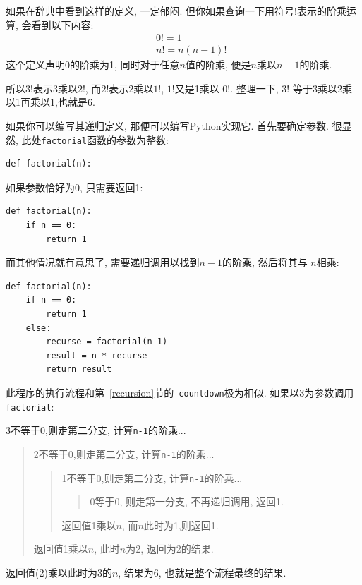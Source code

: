 \documentclass[10pt]{book}
\begin{document}
如果在辞典中看到这样的定义, 一定郁闷. 
但你如果查询一下用符号$!$表示的阶乘运算, 
会看到以下内容:
%
\begin{eqnarray*}
&&  0! = 1 \\
&&  n! = n (n-1)!
\end{eqnarray*}
%
这个定义声明0的阶乘为1, 同时对于任意$n$值的阶乘, 便是$n$乘以$n-1$的阶乘. 

所以$3!$表示3乘以$2!$,  而$2!$表示2乘以$1!$, $1!$又是1乘以
$0!$. 整理一下, $3!$ 等于3乘以2乘以1再乘以1,也就是6.

如果你可以编写其递归定义, 那便可以编写Python实现它. 
首先要确定参数. 很显然, 此处{\tt factorial}函数的参数为整数:

\begin{verbatim}
def factorial(n):
\end{verbatim}
%
如果参数恰好为0, 只需要返回1:

\begin{verbatim}
def factorial(n):
    if n == 0:
        return 1
\end{verbatim}
%
而其他情况就有意思了, 需要递归调用以找到$n-1$的阶乘, 然后将其与
$n$相乘:

\begin{verbatim}
def factorial(n):
    if n == 0:
        return 1
    else:
        recurse = factorial(n-1)
        result = n * recurse
        return result
\end{verbatim}
%
此程序的执行流程和第~\ref{recursion}节的{\tt
countdown}极为相似. 如果以3为参数调用{\tt factorial}:

3不等于0,则走第二分支, 计算{\tt n-1}的阶乘...

\begin{quote}
2不等于0,则走第二分支, 计算{\tt n-1}的阶乘...


  \begin{quote}
 1不等于0,则走第二分支, 计算{\tt n-1}的阶乘...


    \begin{quote}
   0等于0, 则走第一分支, 不再递归调用, 返回1.
    \end{quote}

  返回值1乘以$n$, 而$n$此时为1,则返回1. 
  \end{quote}

返回值1乘以$n$, 此时$n$为2, 返回为2的结果.
\end{quote}

返回值(2)乘以此时为3的$n$, 结果为6, 也就是整个流程最终的结果. 
\end{document}
